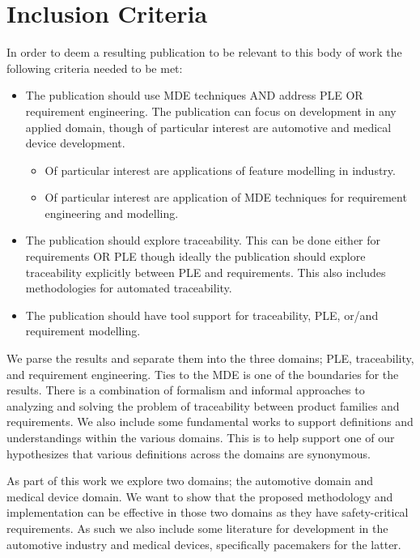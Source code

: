 \section{Inclusion Criteria}

In order to deem a resulting publication to be relevant to this body of work the following criteria needed to be met:
\begin{itemize}
	\item The publication should use \ac{MDE} techniques AND address \ac{PLE} OR requirement engineering. The publication can focus on development in any applied domain, though of particular interest are automotive and medical device development. 
	\begin{itemize}
		\item Of particular interest are applications of feature modelling in industry. 
		\item Of particular interest are application of \ac{MDE} techniques for requirement engineering and modelling.
	\end{itemize}
	\item The publication should explore traceability. This can be done either for requirements OR \ac{PLE} though ideally the publication should explore traceability explicitly between \ac{PLE} and requirements. This also includes methodologies for automated traceability.
	\item The publication should have tool support for traceability, \ac{PLE}, or/and requirement modelling. 
\end{itemize}

We parse the results and separate them into the three domains; \ac{PLE}, traceability, and requirement engineering. Ties to the \ac{MDE} is one of the boundaries for the results. There is a combination of formalism and informal approaches to analyzing and solving the problem of traceability between product families and requirements. We also include some fundamental works to support definitions and understandings within the various domains. This is to help support one of our hypothesizes that various definitions across the domains are synonymous. 

As part of this work we explore two domains; the automotive domain and medical device domain. We want to show that the proposed methodology and implementation can be effective in those two domains as they have safety-critical requirements. As such we also include some literature for development in the automotive industry and medical devices, specifically pacemakers for the latter.

